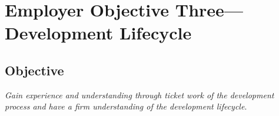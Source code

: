 \section{Employer Objective Three---Development Lifecycle}
\subsection{Objective}
\emph{Gain experience and understanding through ticket work of the development process and have a firm understanding of the development lifecycle}. 

